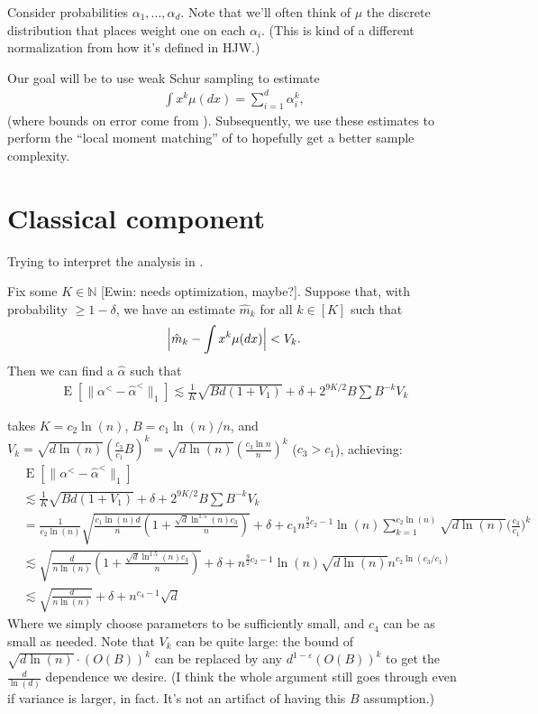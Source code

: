 \documentclass{article}
\theoremstyle{definition}
\DeclareMathOperator{\E}{E}
\DeclarePairedDelimiter{\abs}{\lvert}{\rvert}
\newcommand{\eps}{\varepsilon}
\newcommand{\ewin}[1]{\textrm{\textcolor[RGB]{0,135,219}{[Ewin: #1]}}}
\begin{document}
Consider probabilities $\alpha_1,\ldots,\alpha_d$.
Note that we'll often think of $\mu$ the discrete distribution that places weight one on each $\alpha_i$.
(This is kind of a different normalization from how it's defined in HJW.)

Our goal will be to use weak Schur sampling to estimate
\begin{align*}
    \int x^k \mu(dx) = \sum_{i=1}^d \alpha_i^k,
\end{align*}
(where bounds on error come from \cite{aisw19}).
Subsequently, we use these estimates to perform the ``local moment matching'' of \cite{hjw18} to hopefully get a better sample complexity.

\section{Classical component}

Trying to interpret the analysis in \cite{hjw18}.

\begin{theorem}
Fix some $K \in \mathbb{N}$ \ewin{needs optimization, maybe?}.
Suppose that, with probability $\geq 1-\delta$, we have an estimate $\hat{m}_k$ for all $k \in [K]$ such that
\begin{align*}
    \abs[\Big]{\hat{m}_k - \int x^k \mu(dx)} < V_k.
\end{align*}
Then we can find a $\hat{\alpha}$ such that
\begin{align*}
    \E[\|\alpha^< - \hat{\alpha}^<\|_1] \lesssim \frac1K\sqrt{Bd(1+V_1)} + \delta + 2^{9K/2}B\sum B^{-k}V_k
\end{align*}
\end{theorem}

\cite{hjw18} takes $K = c_2 \ln (n)$, $B = c_1\ln(n)/n$, and $V_k = \sqrt{d\ln(n)}(\frac{c_3}{c_1}B)^k = \sqrt{d\ln(n)}(\frac{c_3\ln n}{n})^k$ ($c_3 > c_1$), achieving:
\begin{align*}
    &\E[\|\alpha^< - \hat{\alpha}^<\|_1] \\
    &\lesssim \frac1K\sqrt{Bd(1+V_1)} + \delta + 2^{9K/2}B\sum B^{-k}V_k \\
    &= \frac{1}{c_2\ln(n)}\sqrt{\frac{c_1\ln(n)d}{n}(1+\frac{\sqrt{d}\ln^{1.5}(n)c_3}{n})} + \delta + c_1n^{\frac{9}{2}c_2 - 1}\ln(n)\sum_{k=1}^{c_2\ln(n)} \sqrt{d\ln(n)}\Big(\frac{c_3}{c_1}\Big)^k \\
    &\lesssim \sqrt{\frac{d}{n\ln(n)}(1+\frac{\sqrt{d}\ln^{1.5}(n)c_3}{n})} + \delta + n^{\frac{9}{2}c_2 - 1}\ln(n)\sqrt{d\ln(n)}n^{c_2\ln(c_3/c_1)} \\
    &\lesssim \sqrt{\frac{d}{n\ln(n)}} + \delta + n^{c_4-1}\sqrt{d}
\end{align*}
Where we simply choose parameters to be sufficiently small, and $c_4$ can be as small as needed.
Note that $V_k$ can be quite large: the bound of $\sqrt{d\ln(n)}\cdot (O(B))^k$ can be replaced by any $d^{1-\eps}(O(B))^k$ to get the $\frac{d}{\ln(d)}$ dependence we desire.
(I think the whole argument still goes through even if variance is larger, in fact. It's not an artifact of having this $B$ assumption.)
\end{document}
